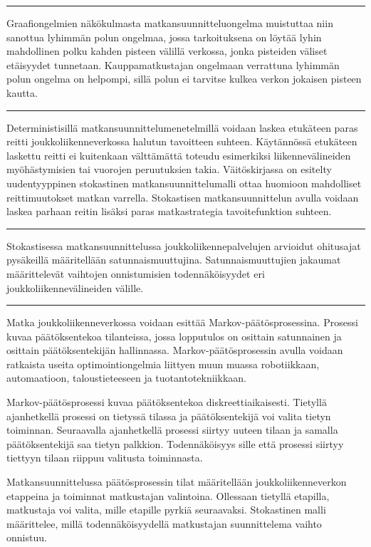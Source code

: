 \documentclass[a4paper,12pt]{article}
\newcommand*\sepline{%
  \begin{center}
    \rule[1ex]{.5\textwidth}{.5pt}
  \end{center}}
\begin{document}
\sepline

Graafiongelmien näkökulmasta matkansuunnitteluongelma muistuttaa niin sanottua lyhimmän polun ongelmaa, jossa
tarkoituksena on löytää lyhin mahdollinen polku kahden pisteen välillä verkossa, jonka pisteiden väliset etäisyydet tunnetaan.
Kauppamatkustajan ongelmaan verrattuna lyhimmän polun ongelma on helpompi, sillä polun ei tarvitse kulkea verkon jokaisen 
pisteen kautta.

\sepline

Deterministisillä matkansuunnittelumenetelmillä voidaan laskea etukäteen paras reitti joukkoliikenneverkossa halutun 
tavoitteen suhteen. Käytännössä etukäteen 
laskettu reitti ei kuitenkaan välttämättä toteudu esimerkiksi liikennevälineiden myöhästymisien tai vuorojen peruutuksien takia. 
Väitöskirjassa on esitelty uudentyyppinen stokastinen matkansuunnittelumalli ottaa huomioon mahdolliset reittimuutokset 
matkan varrella. 
Stokastisen matkansuunnittelun avulla voidaan laskea parhaan reitin lisäksi paras matkastrategia tavoitefunktion suhteen.

\sepline


Stokastisessa matkansuunnittelussa joukkoliikennepalvelujen arvioidut ohitusajat pysäkeillä määritellään satunnaismuuttujina.
Satunnaismuuttujien jakaumat määrittelevät vaihtojen onnistumisien todennäköisyydet eri joukkoliikennevälineiden välille.

\sepline

Matka joukkoliikenneverkossa voidaan esittää Markov-päätösprosessina. Prosessi kuvaa päätöksentekoa tilanteissa, jossa 
lopputulos on osittain satunnainen ja osittain päätöksentekijän hallinnassa.
Markov-päätösprosessin avulla voidaan ratkaista useita optimointiongelmia liittyen muun muassa robotiikkaan, automaatioon, taloustieteeseen 
ja tuotantotekniikkaan. 

Markov-päätösprosessi kuvaa päätöksentekoa diskreettiaikaisesti. Tietyllä ajanhetkellä prosessi on tietyssä tilassa ja 
päätöksentekijä voi valita tietyn toiminnan. Seuraavalla ajanhetkellä
prosessi siirtyy uuteen tilaan ja samalla päätöksentekijä saa tietyn palkkion.
Todennäköisyys sille että prosessi siirtyy tiettyyn tilaan riippuu valitusta toiminnasta. 

Matkansuunnittelussa päätösprosessin tilat määritellään joukkoliikenneverkon etappeina ja toiminnat matkustajan valintoina.
Ollessaan tietyllä etapilla, matkustaja voi valita, mille etapille pyrkiä seuraavaksi. 
Stokastinen malli määrittelee, millä todennäköisyydellä matkustajan suunnittelema vaihto onnistuu.
\end{document}
